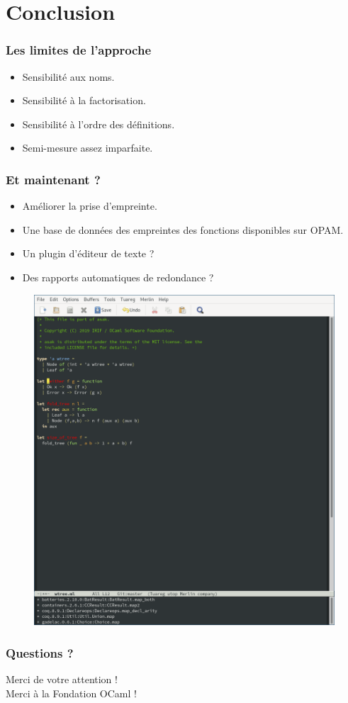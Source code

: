 \documentclass[11pt]{beamer}
\begin{document}
\section{Conclusion}
\begin{frame}
	\frametitle{Les limites de l'approche}
	\begin{itemize}
		\item Sensibilité aux noms.
		\item Sensibilité à la factorisation.
		\item Sensibilité à l'ordre des définitions.
		\item Semi-mesure assez imparfaite.
	\end{itemize}
\end{frame}

\begin{frame}
	\frametitle{Et maintenant ?}
\begin{multicols}{2}
	\begin{itemize}
		\item Améliorer la prise d'empreinte.
		\item Une base de données des empreintes des fonctions disponibles sur OPAM.
		\item Un plugin d'éditeur de texte ?
		\item Des rapports automatiques de redondance ?
	\end{itemize}
\begin{figure}
\includegraphics[scale=0.3]{anzad.png}
\end{figure}
\end{multicols}
\end{frame}

\begin{frame}
	\frametitle{Questions ?}
	\begin{center}
          \Large
		Merci de votre attention ! \\
                Merci à la Fondation OCaml !
	\end{center}
\end{frame}
\end{document}
